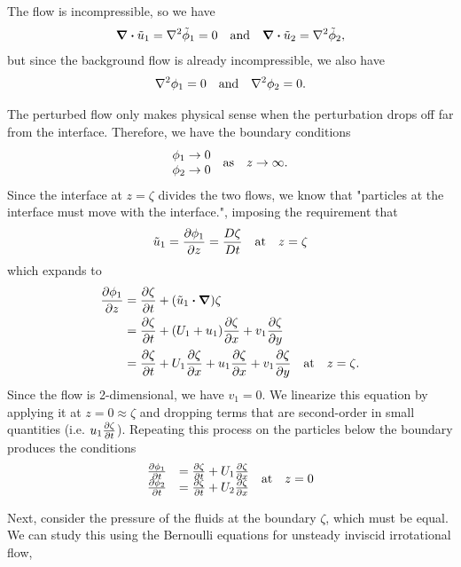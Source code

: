 \documentclass[10pt]{article}
\newcommand{\Dv}[2]{\frac{D#1}{D#2}}
\begin{document}
The flow is incompressible, so we have
\begin{align}
    \div{\tilde{u}_1} = \laplacian \tilde\phi_1 = 0 \qq{and} \div\tilde u_2 = \laplacian \tilde\phi_2,
\end{align}
but since the background flow is already incompressible, we also have
\begin{align}
    \laplacian\phi_1 = 0 \qq{and} \laplacian\phi_2 = 0. \label{eq:lap}
\end{align}

The perturbed flow only makes physical sense when the perturbation drops off far from the interface. Therefore, we have the boundary conditions
\[\mqty{\phi_1 \to 0\\\phi_2\to 0} \qq{as} z\to\infty.\]
Since the interface at $z=\zeta$ divides the two flows, we know that "particles at the interface must move with the interface.", imposing the requirement that
\[\tilde{u}_1 = \pdv{\phi_1}{z} = \Dv{\zeta}{t} \qq{at} z = \zeta\]
which expands to
\begin{align}
    \pdv{\phi_1}{z} & = \pdv{\zeta}{t} + (\tilde{u}_1 \vdot \grad)\zeta \\
                    & = \pdv{\zeta}{t} + (U_1 + u_1)\pdv{\zeta}{x} + v_1\pdv{\zeta}{y} \\
                    & = \pdv{\zeta}{t} + U_1\pdv{\zeta}{x} + u_1\pdv{\zeta}{x} + v_1\pdv{\zeta}{y} \qq{at} z = \zeta.
\end{align}
Since the flow is 2-dimensional, we have $v_1 = 0$. We linearize this equation by applying it at $z = 0 \approx \zeta$ and dropping terms that are second-order in small quantities (i.e. $u_1\pdv{\zeta}{t}$). Repeating this process on the particles below the boundary produces the conditions
\[\mqty{
        \pdv{\phi_1}{t} & = \pdv{\zeta}{t} + U_1\pdv{\zeta}{x} \\
    \pdv{\phi_2}{t} & = \pdv{\zeta}{t} + U_2\pdv{\zeta}{x}} \qq{at} z = 0
\]

Next, consider the pressure of the fluids at the boundary $\zeta$, which must be equal. We can study this using the Bernoulli equations for unsteady inviscid irrotational flow, 
\end{document}
